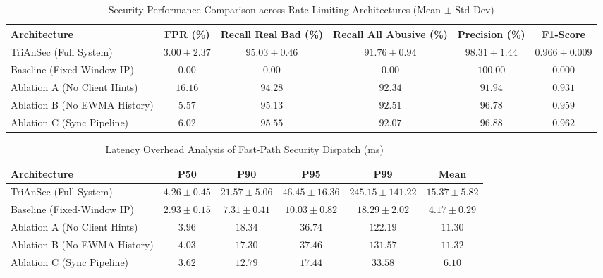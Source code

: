 \begin{table}[htbp]
\centering
\caption{Security Performance Comparison across Rate Limiting Architectures (Mean $\pm$ Std Dev)}
\label{tab:security_metrics}
\begin{tabular}{lccccc}
\hline
\textbf{Architecture} & \textbf{FPR (\%)} & \textbf{Recall Real Bad (\%)} & \textbf{Recall All Abusive (\%)} & \textbf{Precision (\%)} & \textbf{F1-Score} \\ \hline
TriAnSec (Full System) & $3.00 \pm 2.37$ & $95.03 \pm 0.46$ & $91.76 \pm 0.94$ & $98.31 \pm 1.44$ & $0.966 \pm 0.009$ \\
Baseline (Fixed-Window IP) & $0.00$ & $0.00$ & $0.00$ & $100.00$ & $0.000$ \\
Ablation A (No Client Hints) & $16.16$ & $94.28$ & $92.34$ & $91.94$ & $0.931$ \\
Ablation B (No EWMA History) & $5.57$ & $95.13$ & $92.51$ & $96.78$ & $0.959$ \\
Ablation C (Sync Pipeline) & $6.02$ & $95.55$ & $92.07$ & $96.88$ & $0.962$ \\
\hline
\end{tabular}
\end{table}

\begin{table}[htbp]
\centering
\caption{Latency Overhead Analysis of Fast-Path Security Dispatch (ms)}
\label{tab:latency_metrics}
\begin{tabular}{lccccc}
\hline
\textbf{Architecture} & \textbf{P50} & \textbf{P90} & \textbf{P95} & \textbf{P99} & \textbf{Mean} \\ \hline
TriAnSec (Full System) & $4.26 \pm 0.45$ & $21.57 \pm 5.06$ & $46.45 \pm 16.36$ & $245.15 \pm 141.22$ & $15.37 \pm 5.82$ \\
Baseline (Fixed-Window IP) & $2.93 \pm 0.15$ & $7.31 \pm 0.41$ & $10.03 \pm 0.82$ & $18.29 \pm 2.02$ & $4.17 \pm 0.29$ \\
Ablation A (No Client Hints) & $3.96$ & $18.34$ & $36.74$ & $122.19$ & $11.30$ \\
Ablation B (No EWMA History) & $4.03$ & $17.30$ & $37.46$ & $131.57$ & $11.32$ \\
Ablation C (Sync Pipeline) & $3.62$ & $12.79$ & $17.44$ & $33.58$ & $6.10$ \\
\hline
\end{tabular}
\end{table}

